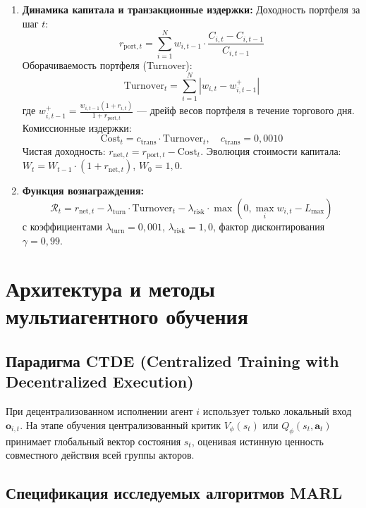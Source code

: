 \documentclass[11pt,a4paper]{article}
\begin{document}
\begin{enumerate}[leftmargin=*]
\item \textbf{Динамика капитала и транзакционные издержки:}
Доходность портфеля за шаг $t$:
$$r_{\text{port}, t} = \sum_{i=1}^N w_{i, t-1} \cdot \frac{C_{i, t} - C_{i, t-1}}{C_{i, t-1}}$$
Оборачиваемость портфеля (Turnover):
$$\text{Turnover}_t = \sum_{i=1}^N |w_{i, t} - w_{i, t-1}^+|$$
где $w_{i, t-1}^+ = \frac{w_{i, t-1}(1 + r_{i, t})}{1 + r_{\text{port}, t}}$ --- дрейф весов портфеля в течение торгового дня.
Комиссионные издержки:
$$\text{Cost}_t = c_{\text{trans}} \cdot \text{Turnover}_t, \quad c_{\text{trans}} = 0{,}0010$$
Чистая доходность: $r_{\text{net}, t} = r_{\text{port}, t} - \text{Cost}_t$.
Эволюция стоимости капитала: $W_t = W_{t-1} \cdot (1 + r_{\text{net}, t})$, $W_0 = 1{,}0$.

\item \textbf{Функция вознаграждения:}
$$\mathcal{R}_t = r_{\text{net}, t} - \lambda_{\text{turn}} \cdot \text{Turnover}_t - \lambda_{\text{risk}} \cdot \max\left(0, \max_i w_{i, t} - L_{\max}\right)$$
с коэффициентами $\lambda_{\text{turn}} = 0{,}001$, $\lambda_{\text{risk}} = 1{,}0$, фактор дисконтирования $\gamma = 0{,}99$.
\end{enumerate}

\section{Архитектура и методы мультиагентного обучения}

\subsection{Парадигма CTDE (Centralized Training with Decentralized Execution)}

При децентрализованном исполнении агент $i$ использует только локальный вход $\mathbf{o}_{i, t}$. На этапе обучения централизованный критик $V_\phi(s_t)$ или $Q_\phi(s_t, \mathbf{a}_t)$ принимает глобальный вектор состояния $s_t$, оценивая истинную ценность совместного действия всей группы акторов.

\subsection{Спецификация исследуемых алгоритмов MARL}
\end{document}
